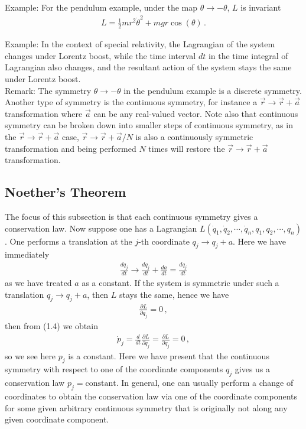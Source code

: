\documentclass[11pt, onesided]{book}
\theoremstyle{break}
\theoremstyle{break}
\newcommand{\pd}{\partial}
\newcommand{\remark}{\color{blue}Remark: \color{black}}
\newcommand{\example}{\color{green}Example: \color{black}}
\begin{document}
\example For the pendulum example, under the map $\theta \to -\theta$, $L$ is invariant
\begin{align*}
L = \frac{1}{2} mr^2 \dot{\theta}^2 + mgr\cos(\theta)\, .
\end{align*}

\example In the context of special relativity, the Lagrangian of the system changes under Lorentz boost, while the time interval $dt$ in the time integral of Lagrangian also changes, and the resultant action of the system stays the same under Lorentz boost.\\

\remark The symmetry $\theta \to -\theta$ in the pendulum example is a discrete symmetry. Another type of symmetry is the continuous symmetry, for instance a $\vec{r} \to \vec{r}+ \vec{a}$ transformation where $\vec{a}$ can be any real-valued vector. Note also that continuous symmetry can be broken down into smaller steps of continuous symmetry, as in the $\vec{r}\to \vec{r} + \vec{a}$ case, $\vec{r} \to \vec{r}+ \vec{a}/N$ is also a continuously symmetric transformation and being performed $N$ times will restore the $\vec{r}\to \vec{r} + \vec{a}$ transformation.\\

\subsection{Noether's Theorem}
The focus of this subsection is that each continuous symmetry gives a conservation law. Now suppose one has a Lagrangian $L(\dot{q}_1,\dot{q}_2,\cdots, \dot{q}_n, q_1,q_2,\cdots, q_n)$. One performs a translation at the $j$-th coordinate $q_j \to q_j + a$. Here we have immediately
\begin{align*}
\frac{dq_j}{dt}\to \frac{dq_j}{dt} + \frac{da}{dt} = \frac{dq_j}{dt} 
\end{align*}
as we have treated $a$ as a constant. If the system is symmetric under such a translation $q_j \to q_j +a$, then $L$ stays the same, hence we have
\begin{align*}
\frac{\pd L}{\pd q_j} = 0\,,
\end{align*}
then from (1.4) we obtain
\begin{align*}
\dot{p}_j = \frac{d}{dt}\frac{\pd L}{\pd \dot{q}_j} = \frac{\pd L}{\pd q_j} = 0\,,
\end{align*}
so we see here $p_j$ is a constant. Here we have present that the continuous symmetry with respect to one of the coordinate components $q_j$ gives us a conservation law $p_j=\text{constant}$. In general, one can usually perform a change of coordinates to obtain the conservation law via one of the coordinate components for some given arbitrary continuous symmetry that is originally not along any given coordinate component.\\
\end{document}
